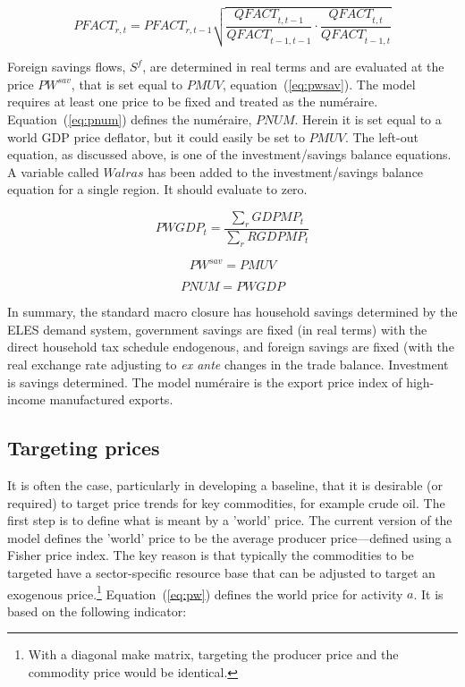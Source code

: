 \documentclass[11pt,letterpaper]{report}
\begin{document}
\begin{equation}
\label{eq:pfact}
\mathit{PFACT}_{r,t} = \mathit{PFACT}_{r,t-1} \sqrt{
   \frac{\mathit{QFACT}_{\mathit{t},\mathit{t-1}}}
      {\mathit{QFACT}_{\mathit{t-1},\mathit{t-1}}} \cdot
   \frac{\mathit{QFACT}_{\mathit{t},\mathit{t}}}
      {\mathit{QFACT}_{\mathit{t-1},\mathit{t}}}
}
\end{equation}

Foreign savings flows, $\mathit{S^f}$, are determined in real terms
and are evaluated at the price $\mathit{PW^{\mathit{sav}}}$, that is set equal
to $\mathit{PMUV}$, equation~(\ref{eq:pwsav}). The model requires at least one
price to be fixed and treated as the num\'eraire. Equation~(\ref{eq:pnum})
defines the num\'eraire, $\mathit{PNUM}$. Herein it is set equal to a world GDP
price deflator, but it could easily be set to $\mathit{PMUV}$.
The left-out equation, as discussed above, is one of the
investment/savings balance equations. A variable called
$\mathit{Walras}$ has been added to the investment/savings
balance equation for a single region. It should evaluate to zero.

\begin{equation}
\label{eq:pwgdp}
\mathit{PWGDP}_t = \frac{\sum_r{\mathit{GDPMP}_t} } {\sum_r{\mathit{RGDPMP}_t}}
\end{equation}

\begin{equation}
\label{eq:pwsav}
\mathit{PW^{\mathit{sav}}} = \mathit{PMUV}
\end{equation}

\begin{equation}
\label{eq:pnum}
\mathit{PNUM} = \mathit{PWGDP}
\end{equation}

In summary, the standard macro closure has household savings determined by the
ELES demand system, government savings are fixed (in real terms) with the direct
household tax schedule endogenous, and foreign savings are fixed (with the real
exchange rate adjusting to \emph{ex ante} changes in the trade balance.
Investment is savings determined. The model num\'eraire is the export price
index of high-income manufactured exports.

\subsection{Targeting prices}

It is often the case, particularly in developing a baseline, that it is
desirable (or required) to target price trends for key commodities, for example
crude oil. The first step is to define what is meant by a 'world' price. The
current version of the model defines the 'world' price to be the average
producer price---defined using a Fisher price index. The key reason is that
typically the commodities to be targeted have a sector-specific resource base
that can be adjusted to target an exogenous price.\footnote{With a diagonal
make matrix, targeting the producer price and the commodity price would be
identical.} Equation~(\ref{eq:pw}) defines the world price for activity $a$.
It is based on the following indicator:
\end{document}
